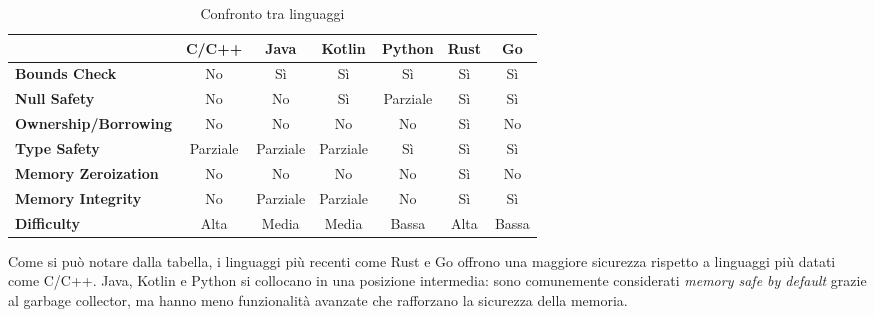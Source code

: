 \small
\setlength{\tabcolsep}{4pt}
\begin{table}[H]
  \centering
  \begin{tabular}{l|c|c|c|c|c|c|}
    \multicolumn{1}{l}{}         & \textbf{C/C++}                & \textbf{Java}                 & \textbf{Kotlin}               & \textbf{Python}               & \textbf{Rust}          & \textbf{Go}               \\
    \hline
    \textbf{Bounds Check}        & \cellcolor{red!20}No          & \cellcolor{green!20}Sì        & \cellcolor{green!20}Sì        & \cellcolor{green!20}Sì        & \cellcolor{green!20}Sì & \cellcolor{green!20}Sì    \\
    \textbf{Null Safety}         & \cellcolor{red!20}No          & \cellcolor{red!20}No          & \cellcolor{green!20}Sì        & \cellcolor{yellow!20}Parziale & \cellcolor{green!20}Sì & \cellcolor{green!20}Sì    \\
    \textbf{Ownership/Borrowing} & \cellcolor{red!20}No          & \cellcolor{red!20}No          & \cellcolor{red!20}No          & \cellcolor{red!20}No          & \cellcolor{green!20}Sì & \cellcolor{red!20}No      \\
    \textbf{Type Safety}         & \cellcolor{yellow!20}Parziale & \cellcolor{yellow!20}Parziale & \cellcolor{yellow!20}Parziale & \cellcolor{green!20}Sì        & \cellcolor{green!20}Sì & \cellcolor{green!20}Sì    \\
    \textbf{Memory Zeroization}  & \cellcolor{red!20}No          & \cellcolor{red!20}No          & \cellcolor{red!20}No          & \cellcolor{red!20}No          & \cellcolor{green!20}Sì & \cellcolor{red!20}No      \\
    \textbf{Memory Integrity}    & \cellcolor{red!20}No          & \cellcolor{yellow!20}Parziale & \cellcolor{yellow!20}Parziale & \cellcolor{red!20}No          & \cellcolor{green!20}Sì & \cellcolor{green!20}Sì    \\
    \textbf{Difficulty}          & \cellcolor{red!20}Alta        & \cellcolor{yellow!20}Media    & \cellcolor{yellow!20}Media    & \cellcolor{green!20}Bassa     & \cellcolor{red!20}Alta & \cellcolor{green!20}Bassa \\
    \hline
  \end{tabular}
  \caption{Confronto tra linguaggi}
  \label{tab:linguaggi_memory_safety}
\end{table}

Come si può notare dalla tabella, i linguaggi più recenti come Rust e Go offrono
una maggiore sicurezza rispetto a linguaggi più datati come C/C++. Java, Kotlin
e Python si collocano in una posizione intermedia: sono comunemente considerati \textit{memory
safe by default} grazie al garbage collector, ma hanno meno funzionalità avanzate
che rafforzano la sicurezza della memoria.

